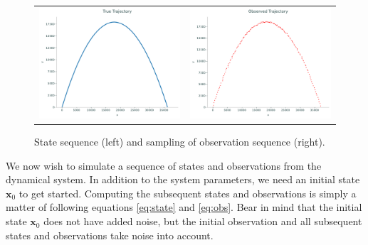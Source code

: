 \begin{figure}
    \centering
    \begin{tabular}{cc}
    \includegraphics[width=.45\textwidth]{figures/states_evolution} &
    \includegraphics[width=.45\textwidth]{figures/obs_evolution}
    \end{tabular}
    \caption{State sequence (left) and sampling of observation sequence (right).}
    \label{fig:evolution}
\end{figure}

We now wish to simulate a sequence of states and observations from the dynamical system.
In addition to the system parameters, we need an initial state $\mathbf{x}_0$ to get started.
Computing the subsequent states and observations is simply a matter of following equations \ref{eq:state} and \ref{eq:obs}.
Bear in mind that the initial state $\mathbf{x}_0$ does not have added noise, but the initial observation and all subsequent states and observations take noise into account.

